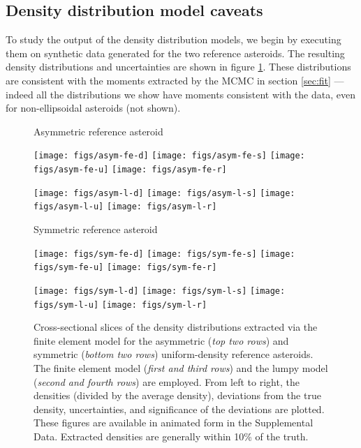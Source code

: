 \documentclass[fleqn,usenatbib]{mnras}
\begin{document}
\subsection{Density distribution model caveats}
\label{sec:density-compare}

To study the output of the density distribution models, we begin by executing them on synthetic data generated for the two reference asteroids. The resulting density distributions and uncertainties are shown in figure \ref{fig:den-uniform}. These distributions are consistent with the moments extracted by the MCMC in section \ref{sec:fit} --- indeed all the distributions we show have moments consistent with the data, even for non-ellipsoidal asteroids (not shown).

\begin{figure}
  Asymmetric reference asteroid

  \texttt{[image: figs/asym-fe-d]}\hfill
  \texttt{[image: figs/asym-fe-s]}\hfill
  \texttt{[image: figs/asym-fe-u]}\hfill
  \texttt{[image: figs/asym-fe-r]}
  
  \texttt{[image: figs/asym-l-d]}\hfill
  \texttt{[image: figs/asym-l-s]}\hfill
  \texttt{[image: figs/asym-l-u]}\hfill
  \texttt{[image: figs/asym-l-r]}

  \vspace{2em}
  Symmetric reference asteroid

  \texttt{[image: figs/sym-fe-d]}\hfill
  \texttt{[image: figs/sym-fe-s]}\hfill
  \texttt{[image: figs/sym-fe-u]}\hfill
  \texttt{[image: figs/sym-fe-r]}

  \texttt{[image: figs/sym-l-d]}\hfill
  \texttt{[image: figs/sym-l-s]}\hfill
  \texttt{[image: figs/sym-l-u]}\hfill
  \texttt{[image: figs/sym-l-r]}

  \caption{Cross-sectional slices of the density distributions extracted via the finite element model for the asymmetric (\textit{top two rows}) and symmetric (\textit{bottom two rows}) uniform-density reference asteroids. The finite element model (\textit{first and third rows}) and the lumpy model (\textit{second and fourth rows}) are employed. From left to right, the densities (divided by the average density), deviations from the true density, uncertainties, and significance of the deviations are plotted. These figures are available in animated form in the Supplemental Data. Extracted densities are generally within 10\% of the truth.}
  \label{fig:den-uniform}
\end{figure}
\end{document}

